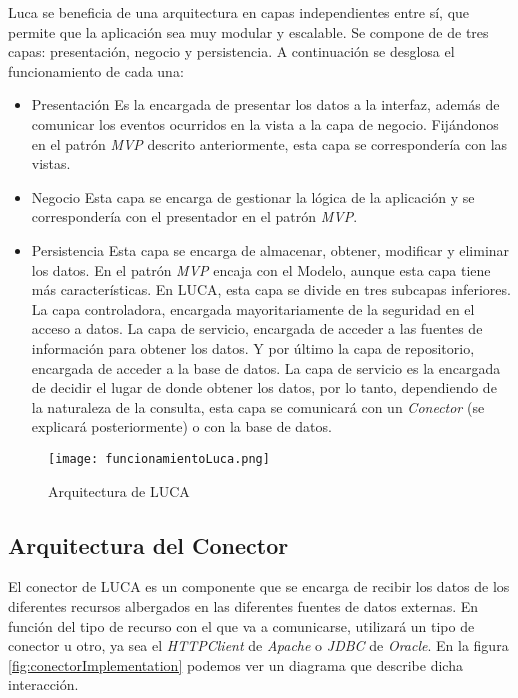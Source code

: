Luca se beneficia de una arquitectura en capas independientes entre sí, que permite que la aplicación sea muy modular y escalable. Se compone de de tres capas: presentación, negocio y persistencia. A continuación se desglosa el funcionamiento de cada una:
\begin{itemize}
	\item Presentación \subitem Es la encargada de presentar los datos a la interfaz, además de comunicar los eventos ocurridos en la vista a la capa de negocio. Fijándonos en el patrón \emph{MVP} descrito anteriormente, esta capa se correspondería con las vistas.
	\item Negocio \subitem Esta capa se encarga de gestionar la lógica de la aplicación y se correspondería con el presentador en el patrón \emph{MVP}.
	\item Persistencia \subitem Esta capa se encarga de almacenar, obtener, modificar y eliminar los datos. En el patrón \emph{MVP} encaja con el Modelo, aunque esta capa tiene más características. En LUCA, esta capa se divide en tres subcapas inferiores. La capa  controladora, encargada mayoritariamente de la seguridad en el acceso a datos. La capa de servicio, encargada de acceder a las fuentes de información para obtener los datos. Y por último la capa de repositorio, encargada de acceder a la base de datos. La capa de servicio es la encargada de decidir el lugar de donde obtener los datos, por lo tanto, dependiendo de la naturaleza de la consulta, esta capa se comunicará con un \emph{Conector} (se explicará posteriormente) o con la base de datos.
\end{itemize}




\begin{figure}[!tb]
	\centering
	\texttt{[image: funcionamientoLuca.png]}
	\caption{Arquitectura de LUCA}
    \label{fig:funcionamientoLuca}
\end{figure}



\subsection{Arquitectura del Conector}


El conector de LUCA es un componente que se encarga de recibir los datos de los diferentes recursos albergados en las diferentes fuentes de datos externas. En función del tipo de recurso con el que va a comunicarse, utilizará un tipo de conector u otro, ya sea el \emph{HTTPClient} \cite{httpclient} de \emph{Apache} o \emph{JDBC} \cite{jdbc} de \emph{Oracle}. En la figura \ref{fig:conectorImplementation} podemos ver un diagrama que describe dicha interacción.

